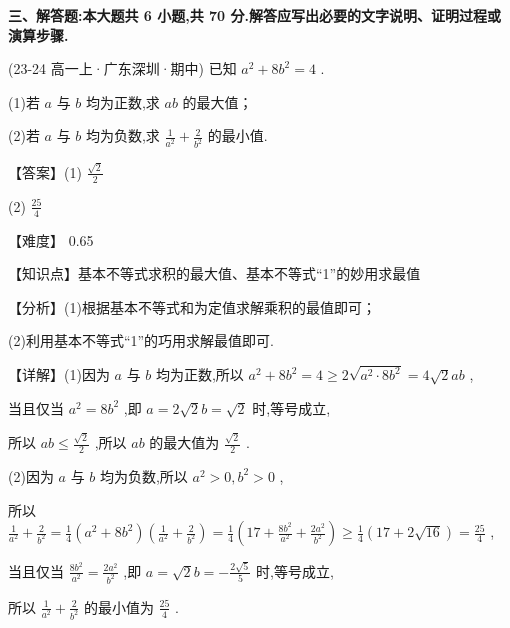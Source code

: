 \documentclass[11pt,a4paper]{article}
\begin{document}
\textbf{三、解答题:本大题共 6 小题,共 70 分.解答应写出必要的文字说明、证明过程或演算步骤.}
\begin{hmwk} 
 (23-24 高一上·广东深圳·期中) 已知 \(\displaystyle {a}^{2} + 8{b}^{2} = 4\) .

(1)若 \(\displaystyle a\) 与 \(\displaystyle b\) 均为正数,求 \(\displaystyle {ab}\) 的最大值；

(2)若 \(\displaystyle a\) 与 \(\displaystyle b\) 均为负数,求 \(\displaystyle \frac{1}{{a}^{2}} + \frac{2}{{b}^{2}}\) 的最小值.

\begin{jiexi}[65]
【答案】(1) \(\displaystyle \frac{\sqrt{2}}{2}\)

(2) \(\displaystyle \frac{25}{4}\)

【难度】 0.65

【知识点】基本不等式求积的最大值、基本不等式“1”的妙用求最值

【分析】(1)根据基本不等式和为定值求解乘积的最值即可；

(2)利用基本不等式“1”的巧用求解最值即可.

【详解】(1)因为 \(\displaystyle a\) 与 \(\displaystyle b\) 均为正数,所以 \(\displaystyle {a}^{2} + 8{b}^{2} = 4 \geq  2\sqrt{{a}^{2} \cdot  8{b}^{2}} = 4\sqrt{2}{ab}\) ,

当且仅当 \(\displaystyle {a}^{2} = 8{b}^{2}\) ,即 \(\displaystyle a = 2\sqrt{2}b = \sqrt{2}\) 时,等号成立,

所以 \(\displaystyle {ab} \leq  \frac{\sqrt{2}}{2}\) ,所以 \(\displaystyle {ab}\) 的最大值为 \(\displaystyle \frac{\sqrt{2}}{2}\) .

(2)因为 \(\displaystyle a\) 与 \(\displaystyle b\) 均为负数,所以 \(\displaystyle {a}^{2} > 0,{b}^{2} > 0\) ,

所以 \(\displaystyle \frac{1}{{a}^{2}} + \frac{2}{{b}^{2}} = \frac{1}{4}\left( {{a}^{2} + 8{b}^{2}}\right) \left( {\frac{1}{{a}^{2}} + \frac{2}{{b}^{2}}}\right)  = \frac{1}{4}\left( {{17} + \frac{8{b}^{2}}{{a}^{2}} + \frac{2{a}^{2}}{{b}^{2}}}\right)  \geq  \frac{1}{4}\left( {{17} + 2\sqrt{16}}\right)  = \frac{25}{4}\) ,

当且仅当 \(\displaystyle \frac{8{b}^{2}}{{a}^{2}} = \frac{2{a}^{2}}{{b}^{2}}\) ,即 \(\displaystyle a = \sqrt{2}b =  - \frac{2\sqrt{5}}{5}\) 时,等号成立,

所以 \(\displaystyle \frac{1}{{a}^{2}} + \frac{2}{{b}^{2}}\) 的最小值为 \(\displaystyle \frac{25}{4}\) .

\end{jiexi}
\end{hmwk}
\end{document}
